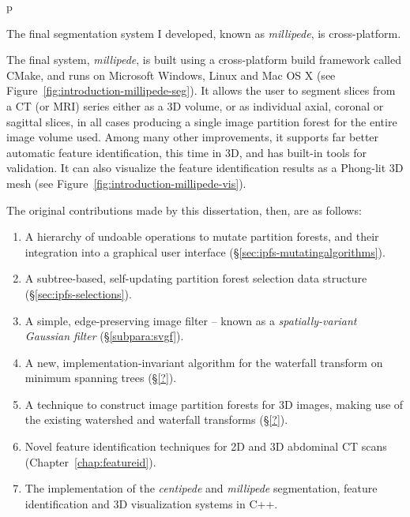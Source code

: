 \begin{stusubfig}{p}
\caption{The final segmentation system I developed, known as \emph{millipede}, is cross-platform.}
\label{fig:introduction-millipede-seg}
\end{stusubfig}

The final system, \emph{millipede}, is built using a cross-platform build framework called CMake, and runs on Microsoft Windows, Linux and Mac OS X (see Figure~\ref{fig:introduction-millipede-seg}). It allows the user to segment slices from a CT (or MRI) series either as a 3D volume, or as individual axial, coronal or sagittal slices, in all cases producing a single image partition forest for the entire image volume used. Among many other improvements, it supports far better automatic feature identification, this time in 3D, and has built-in tools for validation. It can also visualize the feature identification results as a Phong-lit 3D mesh (see Figure~\ref{fig:introduction-millipede-vis}).


The original contributions made by this dissertation, then, are as follows:

\begin{enumerate}
\item A hierarchy of undoable operations to mutate partition forests, and their integration into a graphical user interface (\S\ref{sec:ipfs-mutatingalgorithms}).
\item A subtree-based, self-updating partition forest selection data structure (\S\ref{sec:ipfs-selections}).
\item A simple, edge-preserving image filter -- known as a \emph{spatially-variant Gaussian filter} (\S\ref{subpara:svgf}).
\item A new, implementation-invariant algorithm for the waterfall transform on minimum spanning trees (\S\ref{?}).
\item A technique to construct image partition forests for 3D images, making use of the existing watershed and waterfall transforms (\S\ref{?}).
\item Novel feature identification techniques for 2D and 3D abdominal CT scans (Chapter~\ref{chap:featureid}).
\item The implementation of the \emph{centipede} and \emph{millipede} segmentation, feature identification and 3D visualization systems in C++.
\end{enumerate}

